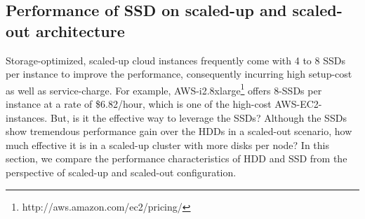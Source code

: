 \documentclass[conference]{IEEEtran}
\begin{document}
\subsection {Performance of SSD on scaled-up and scaled-out architecture} \label{ScaledupClusterAndSSD}
Storage-optimized, scaled-up cloud instances frequently come with 4 to 8 SSDs per instance to improve the performance, consequently incurring high setup-cost as well as service-charge.
For example, AWS-i2.8xlarge\footnote{http://aws.amazon.com/ec2/pricing/} offers 8-SSDs per instance at a rate of \$6.82/hour, which is one of the high-cost AWS-EC2-instances.
But, is it the effective way to leverage the SSDs?
Although the SSDs show tremendous performance gain over the HDDs in a scaled-out scenario, how much effective it is in a scaled-up cluster with more disks per node?
In this section, we compare the performance characteristics of HDD and SSD from the perspective of scaled-up and scaled-out configuration.
\end{document}
